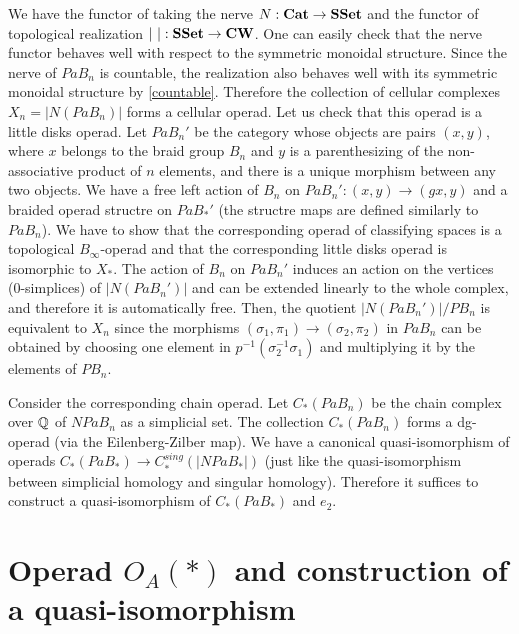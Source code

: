 \documentclass[TFM.tex]{subfiles}
\begin{document}
We have the functor of taking the nerve $N:\mathrm{\mathbf{Cat}}\to\mathrm{\mathbf{SSet}}$ and the functor of topological realization $|\ |:\mathrm{\mathbf{SSet}}\to \mathrm{\mathbf{CW}}$. One can easily check that the nerve functor behaves well with respect to the symmetric monoidal structure. Since the nerve of $PaB_n$ is countable, the realization also behaves well with its symmetric monoidal structure by \ref{countable}. Therefore the collection of cellular complexes $X_n=|N(PaB_n)|$ forms a cellular operad. Let us check that this operad is a little disks operad. Let $PaB_n'$ be the category whose objects are pairs $(x,y)$, where $x$ belongs to the braid group $B_n$ and $y$ is a parenthesizing of the non-associative product of $n$ elements, and there is a unique morphism between any two objects. We have a free left action of $B_n$ on $PaB_n':(x,y)\to (gx,y)$ and a braided operad structre on $PaB_*'$ (the structre maps are defined similarly to $PaB_n$). We have to show that the corresponding operad of classifying spaces is a topological $B_\infty$-operad and that the corresponding little disks operad is isomorphic to $X_*$. The action of $B_n$ on $PaB_n'$ induces an action on the vertices (0-simplices) of $|N(PaB_n')|$ and can be extended linearly to the whole complex, and therefore it is automatically free. Then, the quotient $|N(PaB_n')|/PB_n$ is equivalent to $X_n$ since the morphisms $(\sigma_1,\pi_1)\to(\sigma_2,\pi_2)$ in $PaB_n$ can be obtained by choosing one element in $p^{-1}(\sigma_2^{-1}\sigma_1)$ and multiplying it by the elements of $PB_n$. %

Consider the corresponding chain operad. Let $C_*(PaB_n)$ be the chain complex over $\mathbb{Q}$ of $NPaB_n$ as a simplicial set. The collection $C_*(PaB_n)$ forms a dg-operad (via the Eilenberg-Zilber map). We have a canonical quasi-isomorphism of operads $C_*(PaB_*)\to C_*^{sing}(|NPaB_*|)$ (just like the quasi-isomorphism between simplicial homology and singular homology). Therefore it suffices to construct a quasi-isomorphism of $C_*(PaB_*)$ and $e_2$.

\section{Operad $O_A(*)$ and construction of a quasi-isomorphism}
\end{document}
